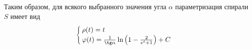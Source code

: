 \documentclass{article}
\numberwithin{equation}{section}
\renewcommand{\phi}{\varphi}
\begin{document}
Таким образом, для всякого выбранного значения угла $\alpha$
параметризация спирали $S$ имеет вид
\begin{equation}
  \begin{cases}
    \rho(t) = t \\
    \phi(t) = \frac{1}{\tg\alpha} \ln\left(1-\frac{2}{e^t+1}\right) + C
  \end{cases}
\end{equation}

\clearpage


\end{document}
